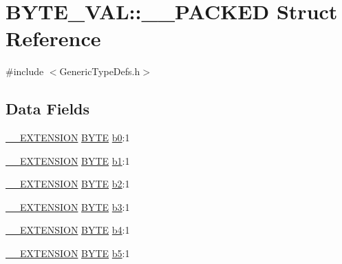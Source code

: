 \hypertarget{struct_b_y_t_e___v_a_l_1_1_____p_a_c_k_e_d}{}\section{B\+Y\+T\+E\+\_\+\+V\+A\+L\+:\+:\+\_\+\+\_\+\+P\+A\+C\+K\+E\+D Struct Reference}
\label{struct_b_y_t_e___v_a_l_1_1_____p_a_c_k_e_d}


{\ttfamily \#include $<$Generic\+Type\+Defs.\+h$>$}

\subsection*{Data Fields}
\begin{DoxyCompactItemize}
\item 
\hyperlink{_generic_type_defs_8h_a6f634b0fdcc4febac630fc28e2685ddb}{\+\_\+\+\_\+\+E\+X\+T\+E\+N\+S\+I\+O\+N} \hyperlink{_generic_type_defs_8h_a4ae1dab0fb4b072a66584546209e7d58}{B\+Y\+T\+E} \hyperlink{struct_b_y_t_e___v_a_l_1_1_____p_a_c_k_e_d_a4010350907c88306a36c21694097c1ca}{b0}\+:1
\item 
\hyperlink{_generic_type_defs_8h_a6f634b0fdcc4febac630fc28e2685ddb}{\+\_\+\+\_\+\+E\+X\+T\+E\+N\+S\+I\+O\+N} \hyperlink{_generic_type_defs_8h_a4ae1dab0fb4b072a66584546209e7d58}{B\+Y\+T\+E} \hyperlink{struct_b_y_t_e___v_a_l_1_1_____p_a_c_k_e_d_ae2d2abb492a9ddfdbac2ffbc74c649a8}{b1}\+:1
\item 
\hyperlink{_generic_type_defs_8h_a6f634b0fdcc4febac630fc28e2685ddb}{\+\_\+\+\_\+\+E\+X\+T\+E\+N\+S\+I\+O\+N} \hyperlink{_generic_type_defs_8h_a4ae1dab0fb4b072a66584546209e7d58}{B\+Y\+T\+E} \hyperlink{struct_b_y_t_e___v_a_l_1_1_____p_a_c_k_e_d_a5cf608c021221107b5b3f65f890408eb}{b2}\+:1
\item 
\hyperlink{_generic_type_defs_8h_a6f634b0fdcc4febac630fc28e2685ddb}{\+\_\+\+\_\+\+E\+X\+T\+E\+N\+S\+I\+O\+N} \hyperlink{_generic_type_defs_8h_a4ae1dab0fb4b072a66584546209e7d58}{B\+Y\+T\+E} \hyperlink{struct_b_y_t_e___v_a_l_1_1_____p_a_c_k_e_d_acf6dffbe5f9b71653822d63806944784}{b3}\+:1
\item 
\hyperlink{_generic_type_defs_8h_a6f634b0fdcc4febac630fc28e2685ddb}{\+\_\+\+\_\+\+E\+X\+T\+E\+N\+S\+I\+O\+N} \hyperlink{_generic_type_defs_8h_a4ae1dab0fb4b072a66584546209e7d58}{B\+Y\+T\+E} \hyperlink{struct_b_y_t_e___v_a_l_1_1_____p_a_c_k_e_d_a991e56ad09245e1ca896cc5143b14e9b}{b4}\+:1
\item 
\hyperlink{_generic_type_defs_8h_a6f634b0fdcc4febac630fc28e2685ddb}{\+\_\+\+\_\+\+E\+X\+T\+E\+N\+S\+I\+O\+N} \hyperlink{_generic_type_defs_8h_a4ae1dab0fb4b072a66584546209e7d58}{B\+Y\+T\+E} \hyperlink{struct_b_y_t_e___v_a_l_1_1_____p_a_c_k_e_d_a5bc6d9bf38897a03e8cfaff1bf671262}{b5}\+:1

\end{DoxyCompactItemize}
